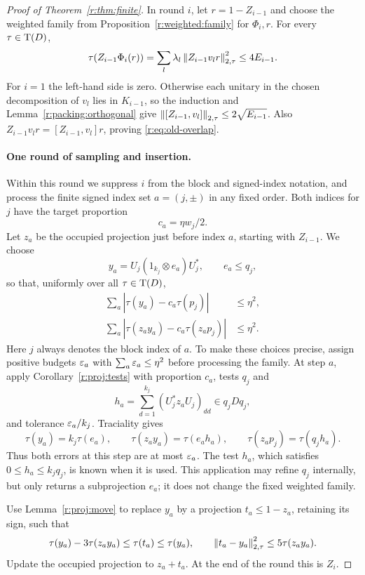 \begin{proof}[Proof of Theorem~\ref{r:thm:finite}]
In round \(i\), let \(r=1-Z_{i-1}\) and choose the weighted family from
Proposition~\ref{r:weighted:family} for \(\Phi_i,r\).
For every \(\tau\in\operatorname T(D)\),
\begin{equation}\label{r:eq:old-overlap}
 \tau(Z_{i-1}\Phi_i(r))
 =\sum_l\lambda_l\left\|Z_{i-1}v_lr\right\|_{2,\tau}^2
 \leq4E_{i-1}.
\end{equation}
For \(i=1\) the left-hand side is zero. Otherwise each unitary in the
chosen decomposition of \(v_l\) lies in \(K_{i-1}\), so the induction
and Lemma~\ref{r:packing:orthogonal} give
\(\left\|[Z_{i-1},v_l]\right\|_{2,\tau}\leq2\sqrt{E_{i-1}}\).
Also \(Z_{i-1}v_lr=[Z_{i-1},v_l]r\), proving
\eqref{r:eq:old-overlap}.

\paragraph{One round of sampling and insertion.}
Within this round we suppress \(i\) from the block and signed-index
notation, and process the finite signed index set \(a=(j,\pm)\) in any
fixed order.
Both indices for \(j\) have the target proportion
\[
 c_a=\eta w_j/2.
\]
Let \(z_a\) be the occupied projection just before index \(a\), starting
with \(Z_{i-1}\). We choose
\[
 y_a=U_j(1_{k_j}\otimes e_a)U_j^*,\qquad e_a\leq q_j,
\]
so that, uniformly over all \(\tau\in\operatorname T(D)\),
\begin{align}
 \sum_a|\tau(y_a)-c_a\tau(p_j)|&\leq\eta^2,
       \label{r:eq:sample-mass-errors}\\
 \sum_a|\tau(z_ay_a)-c_a\tau(z_ap_j)|&\leq\eta^2.
       \label{r:eq:sample-overlap-errors}
\end{align}
Here \(j\) always denotes the block index of \(a\).
To make these choices precise, assign positive budgets
\(\varepsilon_a\) with \(\sum_a\varepsilon_a\leq\eta^2\) before processing the family.
At step \(a\), apply Corollary~\ref{r:proj:tests} with proportion \(c_a\),
tests \(q_j\) and
\[
 h_a=\sum_{d=1}^{k_j}(U_j^*z_aU_j)_{dd}\in q_jDq_j,
\]
and tolerance \(\varepsilon_a/k_j\).
Traciality gives
\[
 \tau(y_a)=k_j\tau(e_a),\qquad
 \tau(z_ay_a)=\tau(e_ah_a),\qquad
 \tau(z_ap_j)=\tau(q_jh_a).
\]
Thus both errors at this step are at most \(\varepsilon_a\).
The test \(h_a\), which satisfies \(0\leq h_a\leq k_jq_j\), is known
when it is used. This application may refine \(q_j\) internally, but
only returns a subprojection \(e_a\); it does not change the fixed
weighted family.

Use Lemma~\ref{r:proj:move} to replace \(y_a\) by a projection
\(t_a\leq1-z_a\), retaining its sign, such that
\begin{equation}\label{r:eq:movement}
 \tau(y_a)-3\tau(z_ay_a)\leq\tau(t_a)\leq\tau(y_a),
 \qquad
 \left\|t_a-y_a\right\|_{2,\tau}^2\leq5\tau(z_ay_a).
\end{equation}
Update the occupied projection to \(z_a+t_a\).
At the end of the round this is \(Z_i\).


\end{proof}

